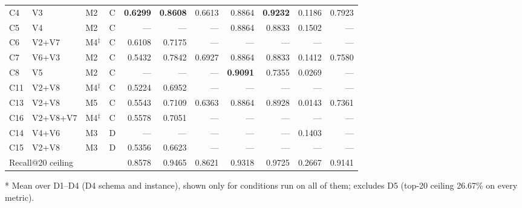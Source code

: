 \begin{table}[t]
\begin{threeparttable}
\begin{tabular}{llllrrrrrrr}
\hline
C4 & V3 & M2 & C & \textbf{0.6299} & \textbf{0.8608} & 0.6613 & 0.8864 & \textbf{0.9232} & 0.1186 & 0.7923 \\
C5 & V4 & M2 & C & --- & --- & --- & 0.8864 & 0.8833 & 0.1502 & --- \\
C6 & V2+V7 & M4$^\ddagger$ & C & 0.6108 & 0.7175 & --- & --- & --- & --- & --- \\
C7 & V6+V3 & M2 & C & 0.5432 & 0.7842 & 0.6927 & 0.8864 & 0.8833 & 0.1412 & 0.7580 \\
C8 & V5 & M2 & C & --- & --- & --- & \textbf{0.9091} & 0.7355 & 0.0269 & --- \\
C11 & V2+V8 & M4$^\ddagger$ & C & 0.5224 & 0.6952 & --- & --- & --- & --- & --- \\
C13 & V2+V8 & M5 & C & 0.5543 & 0.7109 & 0.6363 & 0.8864 & 0.8928 & 0.0143 & 0.7361 \\
C16 & V2+V8+V7 & M4$^\ddagger$ & C & 0.5578 & 0.7051 & --- & --- & --- & --- & --- \\
\hline
C14 & V4+V6 & M3 & D & --- & --- & --- & --- & --- & 0.1403 & --- \\
C15 & V2+V8 & M3 & D & 0.5356 & 0.6623 & --- & --- & --- & --- & --- \\
\hline
\multicolumn{4}{l}{Recall@20 ceiling} & 0.8578 & 0.9465 & 0.8621 & 0.9318 & 0.9725 & 0.2667 & 0.9141 \\
\hline
\end{tabular}
\begin{tablenotes}
\item[*] Mean over D1--D4 (D4 schema and instance), shown only for conditions run on all of them; excludes D5 (top-20 ceiling 26.67\% on every metric).
\end{tablenotes}
\end{threeparttable}
\end{table}
